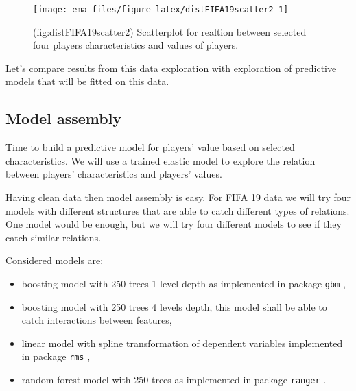 \documentclass[12pt,]{krantz}
\providecommand{\tightlist}{%
  \setlength{\itemsep}{0pt}\setlength{\parskip}{0pt}}
\begin{document}
\begin{figure}

{\centering \texttt{[image: ema\_files/figure-latex/distFIFA19scatter2-1]} 

}

\caption{(fig:distFIFA19scatter2) Scatterplot for realtion between selected four players characteristics and values of players.}\label{fig:distFIFA19scatter2}
\end{figure}

Let's compare results from this data exploration with exploration of predictive models that will be fitted on this data.

\hypertarget{model-assembly}{%
\subsection{Model assembly}\label{model-assembly}}

Time to build a predictive model for players' value based on selected characteristics. We will use a trained elastic model to explore the relation between players' characteristics and players' values.

Having clean data then model assembly is easy. For FIFA 19 data we will try four models with different structures that are able to catch different types of relations. One model would be enough, but we will try four different models to see if they catch similar relations.

Considered models are:

\begin{itemize}
\tightlist
\item
  boosting model with 250 trees 1 level depth as implemented in package \texttt{gbm} \citep{gbm},
\item
  boosting model with 250 trees 4 levels depth, this model shall be able to catch interactions between features,
\item
  linear model with spline transformation of dependent variables implemented in package \texttt{rms} \citep{rms},
\item
  random forest model with 250 trees as implemented in package \texttt{ranger} \citep{rangerRpackage}.
\end{itemize}
\end{document}
